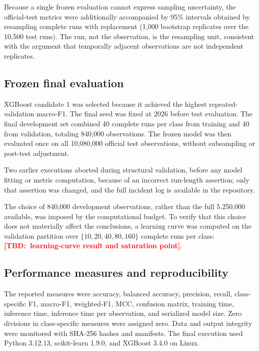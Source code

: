 \documentclass[12pt,a4paper]{article}
\newcommand{\TBD}[1]{\textcolor{red}{\textbf{[TBD:~#1]}}}
\begin{document}
Because a single frozen evaluation cannot express sampling uncertainty, the
official-test metrics were additionally accompanied by 95\% intervals obtained
by resampling complete runs with replacement (1{,}000 bootstrap replicates over
the 10{,}500 test runs). The run, not the observation, is the resampling unit,
consistent with the argument that temporally adjacent observations are not
independent replicates.

\subsection{Frozen final evaluation}

XGBoost candidate 1 was selected because it achieved the highest repeated-
validation macro-F1. The final seed was fixed at 2026 before test evaluation.
The final development set combined 40 complete runs per class from training and
40 from validation, totaling 840,000 observations. The frozen model was then
evaluated once on all 10,080,000 official test observations, without
subsampling or post-test adjustment.

Two earlier executions aborted during structural validation, before any model
fitting or metric computation, because of an incorrect run-length assertion;
only that assertion was changed, and the full incident log is available in the
repository.

The choice of 840,000 development observations, rather than the full 5,250,000
available, was imposed by the computational budget. To verify that this choice
does not materially affect the conclusions, a learning curve was computed on
the validation partition over $\{10,20,40,80,160\}$ complete runs per class:
\TBD{learning-curve result and saturation point}.

\subsection{Performance measures and reproducibility}
\label{sec:reproducibility}

The reported measures were accuracy, balanced accuracy, precision, recall,
class-specific F1, macro-F1, weighted-F1, MCC, confusion matrix, training time,
inference time, inference time per observation, and serialized model size.
Zero divisions in class-specific measures were assigned zero. Data and output
integrity were monitored with SHA-256 hashes and manifests. The final execution
used Python 3.12.13, scikit-learn 1.9.0, and XGBoost 3.4.0 on Linux.
\end{document}
